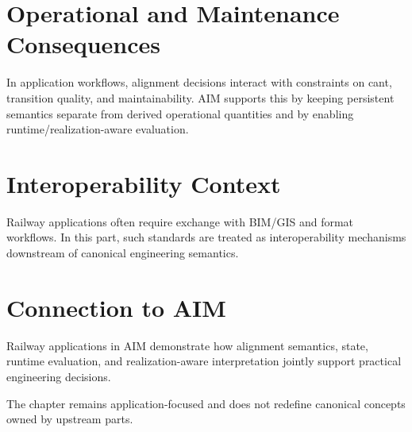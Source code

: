 \section{Operational and Maintenance Consequences}

In application workflows, alignment decisions interact with constraints
on cant, transition quality, and maintainability. AIM supports this by
keeping persistent semantics separate from derived operational
quantities and by enabling runtime/realization-aware evaluation.

\section{Interoperability Context}

Railway applications often require exchange with BIM/GIS and format
workflows. In this part, such standards are treated as interoperability
mechanisms downstream of canonical engineering semantics.

\section{Connection to AIM}

\begin{summary}
Railway applications in AIM demonstrate how alignment semantics, state,
runtime evaluation, and realization-aware interpretation jointly support
practical engineering decisions.

The chapter remains application-focused and does not redefine canonical
concepts owned by upstream parts.
\end{summary}
